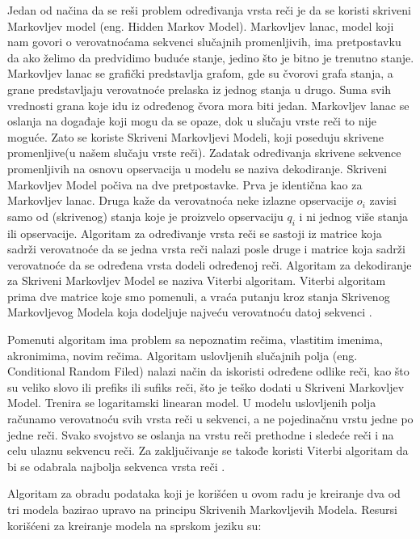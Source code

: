 \documentclass[12pt,oneside]{memoir}
\begin{document}
Jedan od načina da se reši problem određivanja vrsta reči je da se koristi skriveni Markovljev model (eng. Hidden Markov Model). Markovljev lanac, model koji nam govori o verovatnoćama sekvenci slučajnih promenljivih, ima pretpostavku da ako želimo da predvidimo buduće stanje, jedino što je bitno je trenutno stanje. Markovljev lanac se grafički predstavlja grafom, gde su čvorovi grafa stanja, a grane predstavljaju verovatnoće prelaska iz jednog stanja u drugo. Suma svih vrednosti grana koje idu iz određenog čvora mora biti jedan. Markovljev lanac se oslanja na događaje koji mogu da se opaze, dok u slučaju vrste reči to nije moguće. Zato se koriste Skriveni Markovljevi Modeli, koji poseduju skrivene promenljive(u našem slučaju vrste reči). Zadatak određivanja skrivene sekvence promenljivih na osnovu opservacija u modelu se naziva dekodiranje. Skriveni Markovljev Model počiva na dve pretpostavke. Prva je identična kao za Markovljev lanac. Druga kaže da verovatnoća neke izlazne opservacije $o_i$ zavisi samo od (skrivenog) stanja koje je proizvelo opservaciju $q_i$ i ni jednog više stanja ili opservacije\cite{postagging}. 
\newline
\newline
\newline
\newline
Algoritam za određivanje vrsta reči se sastoji iz matrice koja sadrži verovatnoće da se jedna vrsta reči nalazi posle druge i matrice koja sadrži verovatnoće da se određena vrsta dodeli određenoj reči. Algoritam za dekodiranje za Skriveni Markovljev Model se naziva Viterbi algoritam.  Viterbi algoritam prima dve matrice koje smo pomenuli, a vraća putanju kroz stanja Skrivenog Markovljevog Modela koja dodeljuje najveću verovatnoću datoj sekvenci \cite{postagging}.

Pomenuti algoritam ima problem sa nepoznatim rečima, vlastitim imenima, akronimima, novim rečima. Algoritam uslovljenih slučajnih polja (eng.  Conditional Random Filed) nalazi način da iskoristi određene odlike reči, kao što su veliko slovo ili prefiks ili sufiks reči, što je teško dodati u Skriveni Markovljev Model. Trenira se logaritamski linearan model. U modelu uslovljenih polja računamo verovatnoću svih vrsta reči u sekvenci, a ne pojedinačnu vrstu jedne po jedne reči. Svako svojstvo se oslanja na vrstu reči prethodne i sledeće reči i na celu ulaznu sekvencu reči. Za zaključivanje se takođe koristi Viterbi algoritam da bi se odabrala najbolja sekvenca vrsta reči \cite{postagging}.

Algoritam za obradu podataka koji je korišćen u ovom radu je kreiranje dva od tri modela bazirao upravo na principu Skrivenih Markovljevih Modela. Resursi korišćeni za kreiranje modela na sprskom jeziku su:
\end{document}
